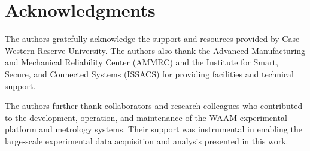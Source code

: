 \documentclass[11pt]{article}
\begin{document}
\section*{Acknowledgments}
The authors gratefully acknowledge the support and resources provided by Case Western Reserve University. The authors also thank the Advanced Manufacturing and Mechanical Reliability Center (AMMRC) and the Institute for Smart, Secure, and Connected Systems (ISSACS) for providing facilities and technical support.

The authors further thank collaborators and research colleagues who contributed to the development, operation, and maintenance of the WAAM experimental platform and metrology systems. Their support was instrumental in enabling the large-scale experimental data acquisition and analysis presented in this work.




\end{document}
